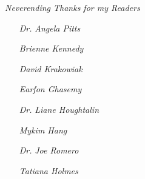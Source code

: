 \thispagestyle{empty}
\vspace*{\fill}
    \textit{Neverending Thanks for my Readers}
    \begin{itemize}
        \item[\textit{Dr.}] {\textit{Angela Pitts}}
        \item[] \textit{Brienne Kennedy}
        \item[] \textit{David Krakowiak}
        \item[] \textit{Earfon Ghasemy}
        \item[\textit{Dr.}] \textit{Liane Houghtalin}
        \item[] \textit{Mykim Hang}
        \item[\textit{Dr.}] \textit{Joe Romero}
        \item[] \textit{Tatiana Holmes}
    \end{itemize}
\vspace*{\fill}
\clearpage